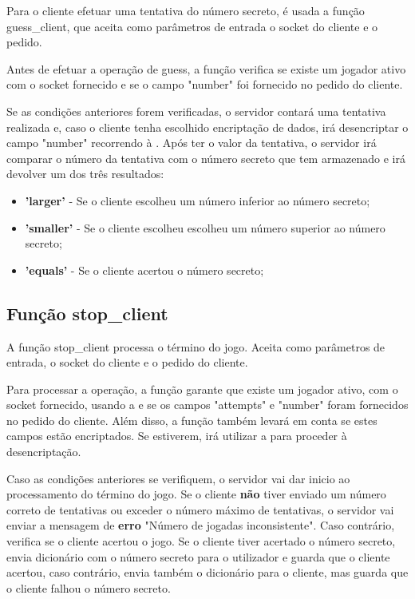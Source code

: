 \documentclass{report}
\begin{document}
Para o cliente efetuar uma tentativa do número secreto, é usada a função guess\_client, que aceita como parâmetros de entrada o socket do cliente e o pedido.

Antes de efetuar a operação de guess, a função verifica se existe um jogador ativo com o socket fornecido e se o campo "number" foi fornecido no pedido do cliente.

Se as condições anteriores forem verificadas, o servidor contará uma tentativa realizada e, caso o cliente tenha escolhido encriptação de dados, irá desencriptar o campo "number" recorrendo à . Após ter o valor da tentativa, o servidor irá comparar o número da tentativa com o número secreto que tem armazenado e irá devolver um dos três resultados:
\begin{itemize}
\item \textbf{'larger'} - Se o cliente escolheu um número inferior ao número secreto;
\item \textbf{'smaller'} - Se o cliente escolheu escolheu um número superior ao número secreto;
\item \textbf{'equals'} - Se o cliente acertou o número secreto;
\end{itemize}

\subsection{Função stop\_client}
\label{ssec:func_stop_client}

A função stop\_client processa o término do jogo. Aceita como parâmetros de entrada, o socket do cliente e o pedido do cliente.

Para processar a operação, a função garante que existe um jogador ativo, com o socket fornecido, usando a   e se os campos "attempts" e "number" foram fornecidos no pedido do cliente. Além disso, a função também levará em conta se estes campos estão encriptados. Se estiverem, irá utilizar a  para proceder à desencriptação.

Caso as condições anteriores se verifiquem, o servidor vai dar inicio ao processamento do término do jogo. Se o cliente \textbf{não} tiver enviado um número correto de tentativas ou exceder o número máximo de tentativas, o servidor vai enviar a mensagem de \textbf{erro} "Número de jogadas inconsistente". Caso contrário, verifica se o cliente acertou o jogo. Se o cliente tiver acertado o número secreto, envia dicionário com o número secreto para o utilizador e guarda que o cliente acertou, caso contrário, envia também o dicionário para o cliente, mas guarda que o cliente falhou o número secreto.
\end{document}

